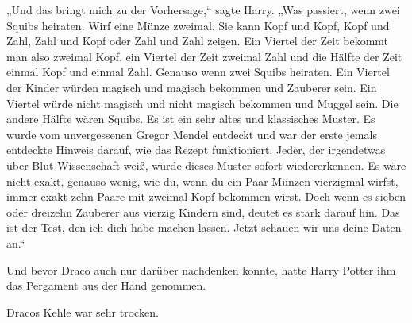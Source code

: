 „Und das bringt mich zu der Vorhersage,“ sagte Harry. „Was passiert, wenn zwei Squibs heiraten. Wirf eine Münze zweimal. Sie kann Kopf und Kopf, Kopf und Zahl, Zahl und Kopf oder Zahl und Zahl zeigen. Ein Viertel der Zeit bekommt man also zweimal Kopf, ein Viertel der Zeit zweimal Zahl und die Hälfte der Zeit einmal Kopf und einmal Zahl. Genauso wenn zwei Squibs heiraten. Ein Viertel der Kinder würden magisch und magisch bekommen und Zauberer sein. Ein Viertel würde nicht magisch und nicht magisch bekommen und Muggel sein. Die andere Hälfte wären Squibs. Es ist ein sehr altes und klassisches Muster. Es wurde vom unvergessenen Gregor Mendel entdeckt und war der erste jemals entdeckte Hinweis darauf, wie das Rezept funktioniert. Jeder, der irgendetwas über Blut-Wissenschaft weiß, würde dieses Muster sofort wiedererkennen. Es wäre nicht exakt, genauso wenig, wie du, wenn du ein Paar Münzen vierzigmal wirfst, immer exakt zehn Paare mit zweimal Kopf bekommen wirst. Doch wenn es sieben oder dreizehn Zauberer aus vierzig Kindern sind, deutet es stark darauf hin. Das ist der Test, den ich dich habe machen lassen. Jetzt schauen wir uns deine Daten an.“

Und bevor Draco auch nur darüber nachdenken konnte, hatte Harry Potter ihm das Pergament aus der Hand genommen.

Dracos Kehle war sehr trocken.

